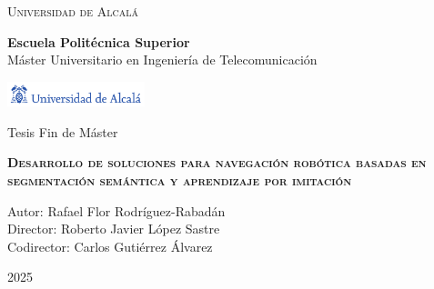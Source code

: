 \setcounter{page}{0}

\begin{center}
\LARGE \textsc{Universidad de Alcalá}\\
\vspace{0.5cm}

\textbf{Escuela Politécnica Superior}\\

Máster Universitario en Ingeniería de Telecomunicación\\
\end{center}

\vspace{0.5cm}


\begin{center}
\includegraphics[width=4cm]{figuras/logo-uah.pdf}
\end{center}


\begin{center}
\vspace{1cm}

\LARGE Tesis Fin de Máster\\

\vspace{0.5cm}

\textbf{\Huge \textsc{{Desarrollo de soluciones para navegación robótica basadas en segmentación semántica y aprendizaje por imitación}}}\\

\vspace{1.5cm}

\large Autor: Rafael Flor Rodríguez-Rabadán\\
Director: Roberto Javier López Sastre\\
Codirector: Carlos Gutiérrez Álvarez\\

\vspace{1.5cm}

\large 2025\\
\end{center}


